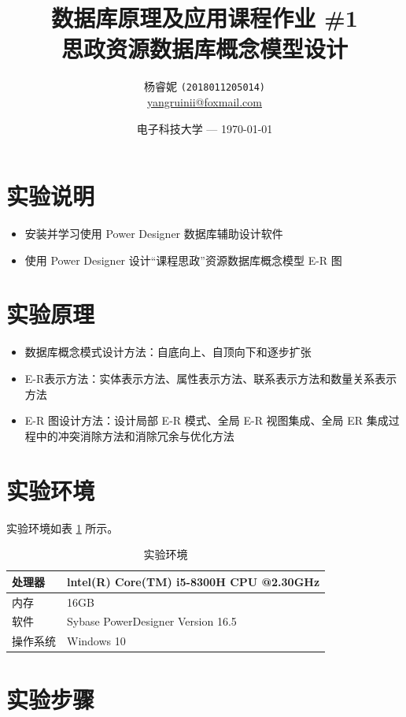 \documentclass[11pt]{article}
\title{\Large 数据库原理及应用课程作业 \#1 \\
  \LARGE 思政资源数据库概念模型设计} %
\author{杨睿妮 \texttt{(2018011205014)} \\ \url{yangruinii@foxmail.com}} %
\date{电子科技大学 --- \today} %
\begin{document}
  
  \maketitle %

  \section{实验说明}
  \begin{itemize}
    \item 安装并学习使用 Power Designer 数据库辅助设计软件
    \item 使用 Power Designer 设计“课程思政”资源数据库概念模型 E-R 图
  \end{itemize}

  \section{实验原理}
  \begin{itemize}
    \item 数据库概念模式设计方法：自底向上、自顶向下和逐步扩张
    \item E-R表示方法：实体表示方法、属性表示方法、联系表示方法和数量关系表示方法
    \item E-R 图设计方法：设计局部 E-R 模式、全局 E-R 视图集成、全局 ER 集成过程中的冲突消除方法和消除冗余与优化方法
  \end{itemize}

  \section{实验环境}
  实验环境如表 \ref{tab:env} 所示。
  \begin{table}[h]
    \centering
    \caption{实验环境}
    \label{tab:env}
    \begin{tabular}{ll}
      \hline
      处理器 & lntel(R) Core(TM) i5-8300H CPU @2.30GHz \\
      \hline
      内存 & 16GB \\
      \hline
      软件 & Sybase PowerDesigner Version 16.5\\
      \hline
      操作系统 & Windows 10 \\
      \hline
    \end{tabular}
  \end{table}

  \section{实验步骤}
\end{document}

